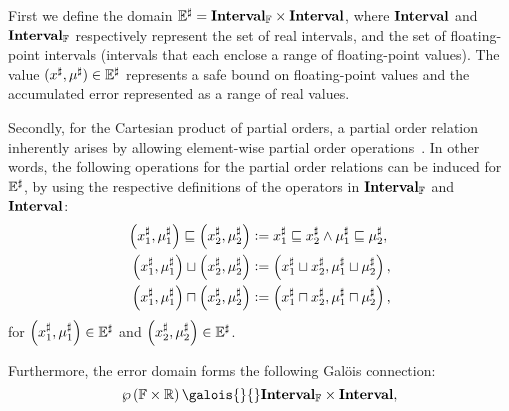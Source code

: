 First we define the domain $\mathbb{E}^\sharp = \mathbf{Interval}_\mathbb{F}\times\mathbf{Interval}$,
where $\mathbf{Interval}$ and $\mathbf{Interval}_\mathbb{F}$ respectively represent the
set of real intervals, and the set of floating-point intervals (intervals
that each enclose a range of floating-point values).  The value $(x^\sharp,
\mu^\sharp) \in \mathbb{E}^\sharp$ represents a safe bound on floating-point
values and the accumulated error represented as a range of real values.

Secondly, for the Cartesian product of partial orders, a partial order
relation inherently arises by allowing element-wise partial order
operations~\cite{abramsky94}.  In other words, the following operations for the
partial order relations can be induced for $\mathbb{E}^\sharp$, by using the respective
definitions of the operators in $\mathbf{Interval}_\mathbb{F}$ and $\mathbf{Interval}$:
\begin{equation}
    \begin{aligned}
        \left( x^\sharp_1, \mu^\sharp_1 \right) \sqsubseteq
        \left( x^\sharp_2, \mu^\sharp_2 \right)
        &\vcentcolon=
            x^\sharp_1 \sqsubseteq x^\sharp_2 \wedge
            \mu^\sharp_1 \sqsubseteq \mu^\sharp_2, \\
        \left( x^\sharp_1, \mu^\sharp_1 \right) \sqcup
        \left( x^\sharp_2, \mu^\sharp_2 \right)
        &\vcentcolon=
            \left( x^\sharp_1 \sqcup x^\sharp_2,
              \mu^\sharp_1 \sqcup \mu^\sharp_2 \right), \\
        \left( x^\sharp_1, \mu^\sharp_1 \right) \sqcap
        \left( x^\sharp_2, \mu^\sharp_2 \right)
        &\vcentcolon=
            \left( x^\sharp_1 \sqcap x^\sharp_2,
              \mu^\sharp_1 \sqcap \mu^\sharp_2 \right),
    \end{aligned}
\end{equation}
for $\left( x^\sharp_1, \mu^\sharp_1 \right) \in \mathbb{E}^\sharp$ and
$\left( x^\sharp_2, \mu^\sharp_2 \right) \in \mathbb{E}^\sharp$.

Furthermore, the error domain forms the following Gal\"ois connection:
\begin{equation}
    \powersetof{\floatset\times\realset}
    \galois{}{}
    \floatintervalset\times\intervalset,
\end{equation}

